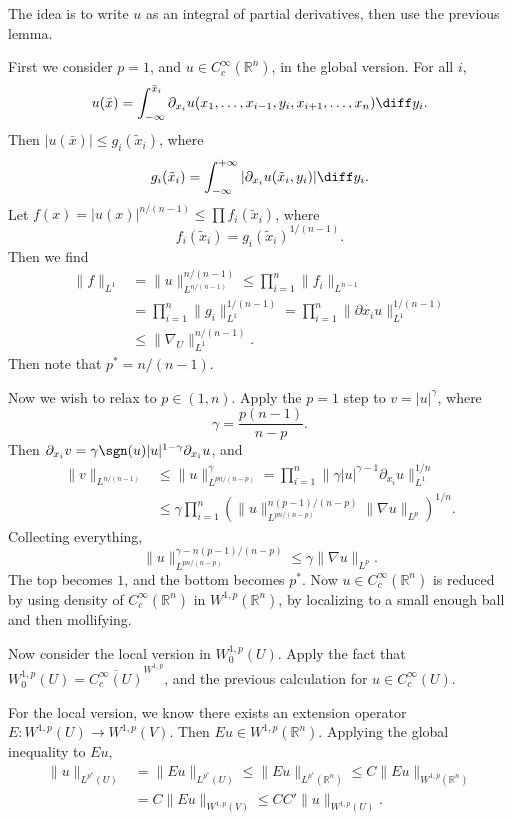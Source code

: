 \documentclass[12pt]{article}
\begin{document}
\begin{proofbox}
	The idea is to write $u$ as an integral of partial derivatives, then use the previous lemma.

	First we consider $p = 1$, and $u \in C_c^\infty(\mathbb{R}^n)$, in the global version. For all $i$,
	\[
	u(\bar x) = \int_{-\infty}^{\bar x_i} \partial_{x_i} u(x_1, \ldots, x_{i-1}, y_i, x_{i+1}, \ldots, x_n) \diff y_i.
	\]
	Then $|u(\bar x)| \leq g_i(\tilde x_i)$, where
	\[
	g_i(\tilde x_i) = \int_{-\infty}^{+\infty} |\partial_{x_i} u(\tilde x_i, y_i)| \diff y_i.
	\]
	Let $f(x) = |u(x)|^{n/(n-1)} \leq \prod f_i(\tilde x_i)$, where
	\[
	f_i(\tilde x_i) = g_i(\tilde x_i)^{1/(n-1)}.
	\]
	Then we find
	\begin{align*}
		\|f\|_{L^1} &= \|u\|^{n/(n-1)}_{L^{n/(n-1)}} \leq \prod_{i = 1}^n \|f_i\|_{L^{n-1}} \\
			    &= \prod_{i = 1}^n \|g_i\|_{L^1}^{1/(n-1)} = \prod_{i = 1}^n \|\partial x_i u\|_{L^1}^{1/(n-1)} \\
			    &\leq \|\nabla_U\|_{L^1}^{n/(n-1)}.
	\end{align*}
	Then note that $p^{\ast} = n/(n-1)$.

	Now we wish to relax to $p \in (1, n)$. Apply the $p = 1$ step to $v = |u|^{\gamma}$, where
	\[
	\gamma = \frac{p(n-1)}{n - p}.
	\]
	Then $\partial_{x_i} v = \gamma \sgn(u) |u|^{1 - \gamma} \partial_{x_i} u$, and
	\begin{align*}
		\|v\|_{L^{n/(n-1)}} &\leq \|u\|^{\gamma}_{L^{pn/(n-p)}} = \prod_{i = 1}^n \|\gamma |u|^{\gamma - 1} \partial_{x_i} u\|_{L^1}^{1/n} \\
				    &\leq \gamma \prod_{i = 1}^n \left( \|u\|_{L^{pn/(n-p)}}^{n(p-1)/(n-p)} \|\nabla u\|_{L^p} \right)^{1/n}.
	\end{align*}
	Collecting everything,
	\[
	\|u\|_{L^{pn/(n-p)}}^{\gamma - n(p-1)/(n-p)} \leq \gamma \|\nabla u\|_{L^p}.
	\]
	The top becomes $1$, and the bottom becomes $p^{\ast}$. Now $u \in C_c^{\infty}(\mathbb{R}^n)$ is reduced by using density of $C_c^{\infty}(\mathbb{R}^n)$ in $W^{1, p}(\mathbb{R}^n)$, by localizing to a small enough ball and then mollifying.

	Now consider the local version in $W^{1,p}_0(U)$. Apply the fact that $W^{1, p}_0(U) = \overline{C_c^{\infty}(U)}^{W^{1,p}}$, and the previous calculation for $u \in C^{\infty}_c(U)$.

	For the local version, we know there exists an extension operator $E : W^{1,p}(U) \to W^{1, p}(V)$. Then $Eu \in W^{1, p}(\mathbb{R}^n)$. Applying the global inequality to $Eu$,
	\begin{align*}
		\|u\|_{L^{p^{\ast}}(U)} &= \|Eu\|_{L^{p^{\ast}}(U)} \leq \|Eu\|_{L^{p^{\ast}}(\mathbb{R}^n)} \leq C \|Eu\|_{W^{1,p}(\mathbb{R}^{n})} \\
					&= C \|Eu\|_{W^{1,p}(V)} \leq C C' \|u\|_{W^{1,p}(U)}.
	\end{align*}
\end{proofbox}
\end{document}
